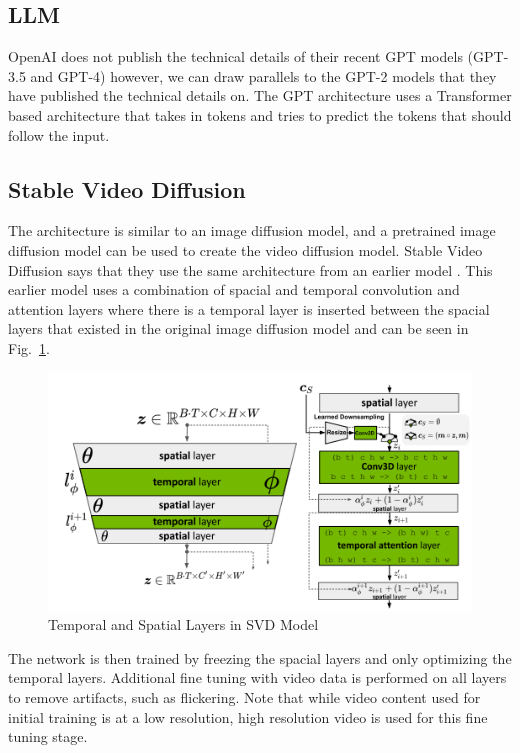 \documentclass[conference]{IEEEtran}
\begin{document}
\subsection{LLM}
OpenAI does not publish the technical details of their recent GPT models (GPT-3.5 and GPT-4) however, we can draw
parallels to the GPT-2 \cite{gpt2} models that they have published the technical details on.
The GPT \cite{gpt} architecture uses a Transformer based architecture that takes in tokens and tries to
predict the tokens that should follow the input.

\subsection{Stable Video Diffusion}

The architecture is similar to an image diffusion model, and a pretrained image diffusion model can be used to create the video diffusion model. Stable Video Diffusion \cite{svd} says that they use the same architecture from an earlier model \cite{align}. This earlier model uses a combination of spacial and temporal convolution and attention layers where there is a temporal layer is inserted between the spacial layers that existed in the original image diffusion model and can be seen in Fig.~\ref{fig:temporal}.

\begin{figure}[htb]
    \centering
    \includegraphics[scale = 0.9]{svd img 1.png}
    \caption{Temporal and Spatial Layers in SVD Model}
    \label{fig:temporal}
\end{figure}

The network is then trained by freezing the spacial layers and only optimizing the temporal layers. Additional fine tuning with video data is performed on all layers to remove artifacts, such as flickering. Note that while video content used for initial training is at a low resolution, high resolution video is used for this fine tuning stage. \\
\end{document}
